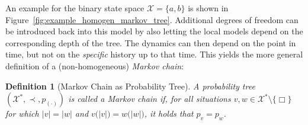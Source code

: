 \documentclass[11pt]{book}
\newtheorem{definition}{Definition}
\newcommand{\states}{\mathcal{X}}
\begin{document}
An example for the binary state space $\states=\{a,b\}$ is shown in Figure~\ref{fig:example_homogen_markov_tree}. Additional degrees of freedom can be introduced back into this model by also letting the local models depend on the corresponding depth of the tree. The dynamics can then depend on the point in time, but not on the \emph{specific} history up to that time. This yields the more general definition of a (non-homogeneous) \emph{Markov chain}:
\begin{definition}[Markov Chain as Probability Tree]\label{def:prob_tree_markov}
A probability tree $(\states^*,\prec,p_{(\cdot)})$ is called a Markov chain if, for all situations $v,w\in\states^*\setminus\{\Box\}$ for which $\lvert v\rvert=\lvert w\rvert$ and $v\bigl(\lvert v\rvert\bigr)=w\bigl(\lvert w\rvert\bigr)$, it holds that $p_v=p_w$.
\end{definition}
\end{document}
